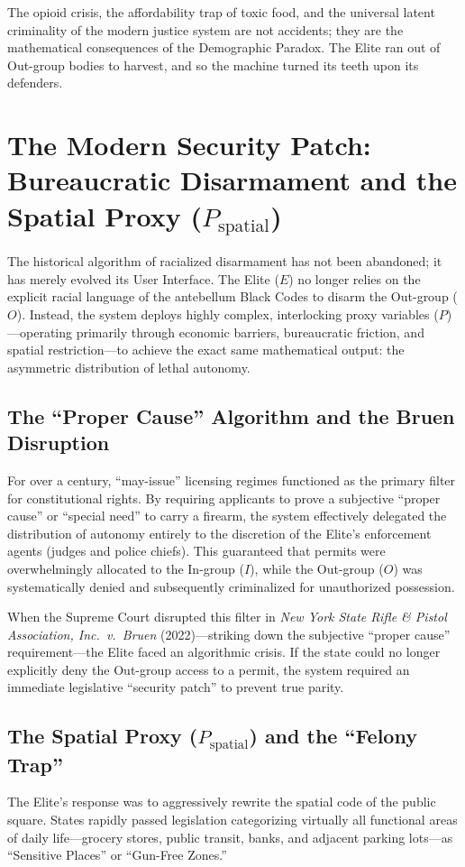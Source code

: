 \documentclass[12pt,openany]{book}
\begin{document}
The opioid crisis, the affordability trap of toxic food, and the universal latent criminality of the modern justice system are not accidents; they are the mathematical consequences of the Demographic Paradox. The Elite ran out of Out-group bodies to harvest, and so the machine turned its teeth upon its defenders.

\section{The Modern Security Patch: Bureaucratic Disarmament and the Spatial Proxy (\texorpdfstring{$P_{\text{spatial}}$}{P\_spatial})}

The historical algorithm of racialized disarmament has not been abandoned; it has merely evolved its User Interface. The Elite ($E$) no longer relies on the explicit racial language of the antebellum Black Codes to disarm the Out-group ($O$). Instead, the system deploys highly complex, interlocking proxy variables ($P$)---operating primarily through economic barriers, bureaucratic friction, and spatial restriction---to achieve the exact same mathematical output: the asymmetric distribution of lethal autonomy.

\subsection{The ``Proper Cause'' Algorithm and the Bruen Disruption}
For over a century, ``may-issue'' licensing regimes functioned as the primary filter for constitutional rights. By requiring applicants to prove a subjective ``proper cause'' or ``special need'' to carry a firearm, the system effectively delegated the distribution of autonomy entirely to the discretion of the Elite's enforcement agents (judges and police chiefs). This guaranteed that permits were overwhelmingly allocated to the In-group ($I$), while the Out-group ($O$) was systematically denied and subsequently criminalized for unauthorized possession.

When the Supreme Court disrupted this filter in \textit{New York State Rifle \& Pistol Association, Inc.\ v.\ Bruen} (2022)---striking down the subjective ``proper cause'' requirement---the Elite faced an algorithmic crisis. If the state could no longer explicitly deny the Out-group access to a permit, the system required an immediate legislative ``security patch'' to prevent true parity.

\subsection{The Spatial Proxy (\texorpdfstring{$P_{\text{spatial}}$}{P\_spatial}) and the ``Felony Trap''}
The Elite's response was to aggressively rewrite the spatial code of the public square. States rapidly passed legislation categorizing virtually all functional areas of daily life---grocery stores, public transit, banks, and adjacent parking lots---as ``Sensitive Places'' or ``Gun-Free Zones.''
\end{document}
